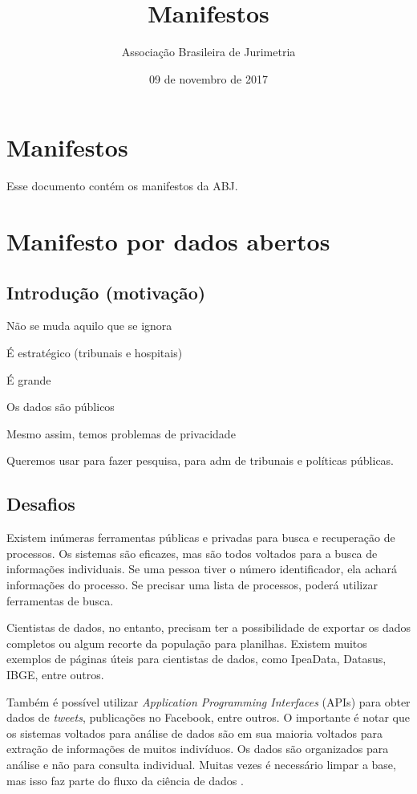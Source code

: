 \documentclass[]{report}
\title{Manifestos}
\author{Associação Brasileira de Jurimetria}
\date{09 de novembro de 2017}
\begin{document}
\maketitle

\chapter*{Manifestos}\label{manifestos}


Esse documento contém os manifestos da ABJ.

\chapter{Manifesto por dados abertos}\label{manifesto-por-dados-abertos}

\section{Introdução (motivação)}\label{introducao-motivacao}

Não se muda aquilo que se ignora

É estratégico (tribunais e hospitais)

É grande

Os dados são públicos

Mesmo assim, temos problemas de privacidade

Queremos usar para fazer pesquisa, para adm de tribunais e políticas
públicas.

\section{Desafios}\label{desafios}

Existem inúmeras ferramentas públicas e privadas para busca e
recuperação de processos. Os sistemas são eficazes, mas são todos
voltados para a busca de informações individuais. Se uma pessoa tiver o
número identificador, ela achará informações do processo. Se precisar
uma lista de processos, poderá utilizar ferramentas de busca.

Cientistas de dados, no entanto, precisam ter a possibilidade de
exportar os dados completos ou algum recorte da população para
planilhas. Existem muitos exemplos de páginas úteis para cientistas de
dados, como IpeaData, Datasus, IBGE, entre outros.

Também é possível utilizar \emph{Application Programming Interfaces}
(APIs) para obter dados de \emph{tweets}, publicações no Facebook, entre
outros. O importante é notar que os sistemas voltados para análise de
dados são em sua maioria voltados para extração de informações de muitos
indivíduos. Os dados são organizados para análise e não para consulta
individual. Muitas vezes é necessário limpar a base, mas isso faz parte
do fluxo da ciência de dados \citep{wickham2016r}.
\end{document}
